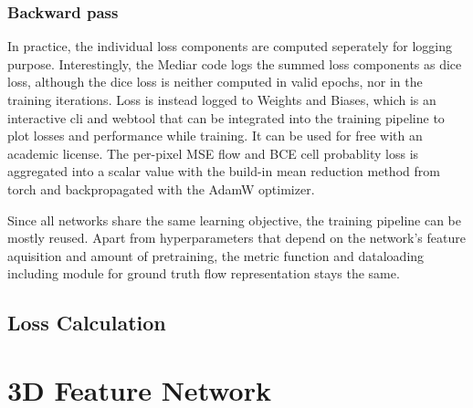 \subsubsection{Backward pass}


In practice, the individual loss components are computed seperately for logging purpose. Interestingly, the Mediar code logs the summed loss components as dice loss, although the dice loss is neither computed in valid epochs, nor in the training iterations. Loss is instead logged to Weights and Biases, which is an interactive cli and webtool that can be integrated into the training pipeline to plot losses and performance while training. It can be used for free with an academic license.
The per-pixel MSE flow and BCE cell probablity loss is aggregated into a scalar value with the build-in mean reduction method from torch and backpropagated with the AdamW optimizer.


Since all networks share the same learning objective, the training pipeline can be mostly reused. Apart from hyperparameters that depend on the network's feature aquisition and amount of pretraining, the metric function and dataloading including module for ground truth flow representation stays the same.



\subsection{Loss Calculation}

\section{3D Feature Network}




